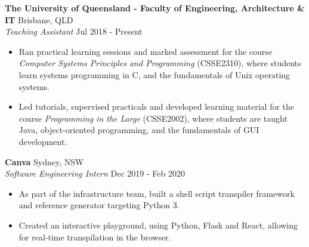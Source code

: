 \documentclass[a4paper]{article}
\newenvironment{myitemize}
{   \small
    \vspace{-2pt}
    \begin{itemize}
    \setlength{\itemsep}{0pt}
    \setlength{\parskip}{0pt}
    \setlength{\parsep}{0pt}     }
{ \end{itemize}                  }
\begin{document}
\textbf{The University of Queensland - Faculty of Engineering, Architecture \& IT} \hfill Brisbane, QLD\\
\textit{Teaching Assistant} \hfill Jul 2018 - Present\\
\vspace{-0.5mm}
\begin{myitemize} \itemsep 0.5mm
	\item Ran practical learning sessions and marked assessment for the course \textit{Computer Systems Principles and Programming} (CSSE2310),  where students learn systems programming in C, and the fundamentals of Unix operating systems.
	\item Led tutorials, supervised practicals and developed learning material for the course \textit{Programming in the Large} (CSSE2002), where students are taught Java, object-oriented programming, and the fundamentals of GUI development.
\end{myitemize}


\textbf{Canva} \hfill Sydney, NSW\\
\textit{Software Engineering Intern} \hfill Dec 2019 - Feb 2020\\
\begin{myitemize} \itemsep 0.5mm
	\item As part of the infrastructure team, built a shell script transpiler framework and reference generator targeting Python 3.
	\item Created an interactive playground, using Python, Flask and React, allowing for real-time transpilation in the browser.
\end{myitemize}
\end{document}
